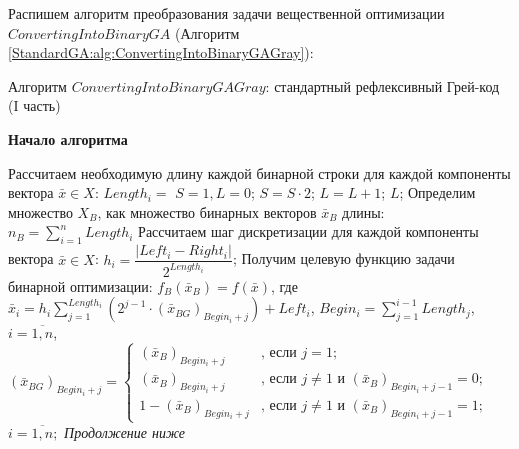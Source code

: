Распишем алгоритм преобразования задачи вещественной оптимизации $ ConvertingIntoBinaryGA $ (Алгоритм  \ref{StandardGA:alg:ConvertingIntoBinaryGAGray}):

\begin{algorithm}
\caption{Алгоритм $ ConvertingIntoBinaryGAGray $: стандартный рефлексивный Грей-код (I часть)}\label{StandardGA:alg:ConvertingIntoBinaryGAGray}
\begin{algorithmic}
\State \textbf{Начало алгоритма}

\State Рассчитаем необходимую длину каждой бинарной строки для каждой компоненты вектора $ \bar{x}\in X $:
\State $ Length_i= $
\BeginBlock
\State $ S=1, L=0 $;
\State $ S=S\cdot 2 $;
\State $ L=L+1 $;
\EndWhile
\State \Return $ L $;
\EndBlock
\State Определим множество $ X_B $, как множество бинарных векторов $ \bar{x}_B $ длины:  
\State $ n_B=\sum_{i=1}^{n}Length_i $
\State Рассчитаем шаг дискретизации для каждой компоненты вектора  $ \bar{x} \in X $:  
\State $ h_i=\dfrac{\left| Left_i-Right_i\right| }{2^{Length_i}} $;
\State Получим целевую функцию задачи бинарной оптимизации:
\State $ f_B\left( \bar{x}_B\right)=f\left( \bar{x}\right) $, где
\State $ \bar{x}_i=h_i \sum_{j=1}^{Length_i} \left( 2^{j-1}\cdot {\left( \bar{x}_{BG}\right) }_{Begin_i+j} \right)+Left_i $,
\State $ Begin_i =\sum_{j=1}^{i-1}Length_j $, $ i=\overline{1,n} $,
\State $ {\left( \bar{x}_{BG}\right) }_{Begin_i+j} = \left\lbrace \begin{aligned}
{\left( \bar{x}_{B}\right) }_{Begin_i+j}&\text{, если } j=1; \\ {\left( \bar{x}_{B}\right) }_{Begin_i+j}&\text{, если } j\neq 1 \text{ и } {\left( \bar{x}_{B}\right) }_{Begin_i+j-1}=0; \\1-{\left( \bar{x}_{B}\right) }_{Begin_i+j}&\text{, если } j\neq 1 \text{ и } {\left( \bar{x}_{B}\right) }_{Begin_i+j-1}=1; 
\end{aligned}\right.$
\State $i=\overline{1,n} ;$
\State \textit{Продолжение ниже}
 
  \end{algorithmic}
\end{algorithm}
\singlespacing
~\\

